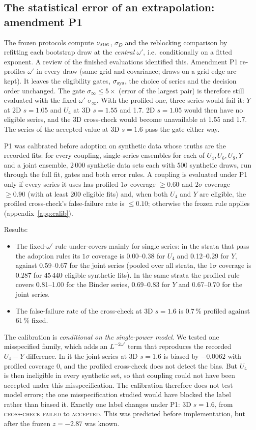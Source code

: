 \documentclass[10pt,a4paper]{article}
\newcommand{\lbl}[1]{{\mdseries\scshape #1}}
\newcommand{\sstat}{\sigma_{\rm stat}}
\newcommand{\ssys}{\sigma_{\rm sys}}
\begin{document}
\subsection{The statistical error of an extrapolation: amendment P1}\label{sec:p1}
The frozen protocols compute $\sstat$, $\sigma_D$ and the reblocking comparison by refitting each bootstrap draw at the \emph{central}
$\omega'$, i.e.\ conditionally on a fitted exponent. A review of the finished evaluations identified this. Amendment P1
re-profiles $\omega'$ in every draw (same grid and covariance; draws on a grid edge are kept). It leaves the eligibility gates, $\ssys$, the
choice of series and the decision order unchanged. The gate $\sigma_\infty\le5\times$ (error of the largest pair) is therefore still evaluated
with the fixed-$\omega'$ $\sigma_\infty$. With the profiled one, three series would fail it: $Y$ at 2D $s=1.05$ and $U_4$ at 3D $s=1.55$ and
1.7. 2D $s=1.05$ would then have no eligible series, and the 3D cross-check would become unavailable at 1.55 and 1.7. The series of the
accepted value at 3D $s=1.6$ pass the gate either way.

P1 was calibrated before adoption on synthetic data whose truths are the recorded fits: for every coupling, single-series ensembles for each
of $U_4,U_6,U_8,Y$ and a joint ensemble, 2\,000 synthetic data sets each with 500 synthetic draws, run through the full fit, gates and both error
rules. A coupling is evaluated under P1 only if every series it uses has profiled $1\sigma$ coverage $\ge0.60$ and $2\sigma$ coverage $\ge0.90$
(with at least 200 eligible fits) and, when both $U_4$ and $Y$ are eligible, the profiled cross-check's false-failure rate is $\le0.10$;
otherwise the frozen rule applies (appendix~\ref{app:calib}).

Results:
\begin{itemize}
\item The fixed-$\omega'$ rule under-covers mainly for single series: in the strata that pass the adoption rules its $1\sigma$ coverage is
 0.00--0.38 for $U_4$ and 0.12--0.29 for $Y$, against 0.59--0.67 for the joint series (pooled over all strata, the $1\sigma$ coverage is 0.287 for
45\,440 eligible synthetic fits). In the same
 strata the profiled rule covers 0.81--1.00 for the Binder series, 0.69--0.83 for $Y$ and 0.67--0.70 for the joint series.
\item The false-failure rate of the cross-check at 3D $s=1.6$ is 0.7\,\% profiled against 61\,\% fixed.
\end{itemize}
The calibration is \emph{conditional on the single-power model}. We tested one misspecified family, which adds an $L^{-2\omega'}$ term that
reproduces the recorded $U_4-Y$ difference. In it the joint series at 3D $s=1.6$ is biased by $-0.0062$ with profiled coverage 0, and the
profiled cross-check does not detect the bias. But $U_4$ is then ineligible in every synthetic set, so that coupling could not have been
accepted under this misspecification.
The calibration therefore does not test model errors; the one misspecification studied would have blocked the label rather than biased it.
Exactly one label changes under P1: 3D $s=1.6$, from \lbl{cross-check failed} to \lbl{accepted}. This was predicted before implementation, but
after the frozen $z=-2.87$ was known.
\end{document}
